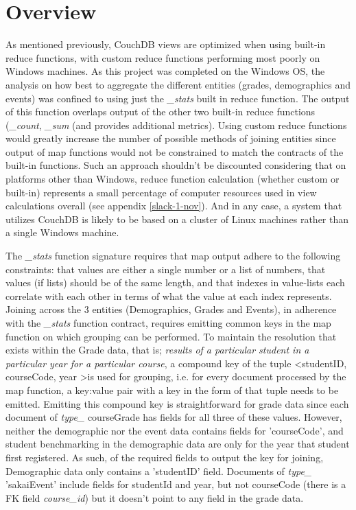 \section{Overview}
As mentioned previously, CouchDB views are optimized when using built-in reduce functions, with custom reduce functions performing most poorly on Windows machines. As this project was completed on the Windows OS, the analysis on how best to aggregate the different entities (grades, demographics and events) was confined to using just the \textit{\_stats} built in reduce function. The output of this function overlaps output of the other two built-in reduce functions (\textit{\_count}, \textit{\_sum} (and provides additional metrics). Using custom reduce functions would greatly increase the number of possible methods of joining entities since output of map functions would not be constrained to match the contracts of the built-in functions. Such an approach shouldn't be discounted considering that on platforms other than Windows, reduce function calculation (whether custom or built-in) represents a small percentage of computer resources used in view calculations overall (see appendix \ref{slack-1-nov}). And in any case, a system that utilizes CouchDB is likely to be based on a cluster of Linux machines rather than a single Windows machine.

The \textit{\_stats} function signature requires that map output adhere to the following constraints: that values are either a single number or a list of numbers, that values (if lists) should be of the same length, and that indexes in value-lists each correlate with each other in terms of what the value at each index represents. Joining across the 3 entities (Demographics, Grades and Events), in adherence with the \textit{\_stats} function contract, requires emitting common keys in the map function on which grouping can be performed. To maintain the resolution that exists within the Grade data, that is; \textit{results of a particular student in a particular year for a particular course}, a compound key of the tuple \textless studentID, courseCode, year \textgreater is used for grouping, i.e. for every document processed by the map function, a key:value pair with a key in the form of that tuple needs to be emitted. Emitting this compound key is straightforward for grade data since each document of \textit{type\_} courseGrade has fields for all three of these values. However, neither the demographic nor the event data contains fields for 'courseCode', and student benchmarking in the demographic data are only for the year that student first registered. As such, of the required fields to output the key for joining, Demographic data only contains a 'studentID' field. Documents of \textit{type\_} 'sakaiEvent' include fields for studentId and year, but not courseCode (there is a FK field \textit{course\_id}) but it doesn't point to any field in the grade data.

